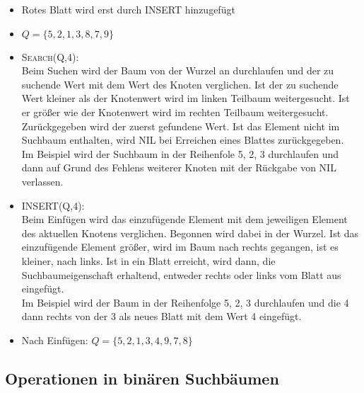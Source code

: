 \documentclass[ngerman,draft,parskip=half*,twoside]{scrreprt}
\theoremstyle{break}
\begin{document}
  \begin{itemize}
   \item Rotes Blatt wird erst durch INSERT hinzugefügt
   \item $Q = \{ 5, 2, 1, 3, 8, 7, 9 \}$
   \item \textsc{Search}(Q,4): \\
      Beim Suchen wird der Baum von der Wurzel an durchlaufen und der zu 
      suchende Wert mit dem Wert des Knoten verglichen. Ist der zu suchende 
      Wert kleiner als der Knotenwert wird im linken Teilbaum weitergesucht. 
      Ist er größer wie der Knotenwert wird im rechten Teilbaum 
      weitergesucht. Zurückgegeben wird der zuerst gefundene Wert. Ist das 
      Element nicht im Suchbaum enthalten, wird NIL bei Erreichen eines 
      Blattes zurückgegeben.\\
      Im Beispiel wird der Suchbaum in der Reihenfole 5, 2, 3 durchlaufen 
      und dann auf Grund des Fehlens weiterer Knoten mit der Rückgabe von 
      NIL verlassen.
   \item INSERT(Q,4): \\
      Beim Einfügen wird das einzufügende Element mit dem jeweiligen 
      Element des aktuellen Knotens verglichen. Begonnen wird dabei in der 
      Wurzel. Ist das einzufügende Element größer, wird im Baum nach 
      rechts gegangen, ist es kleiner, nach links. Ist in ein 
      Blatt erreicht, wird dann, die Suchbaumeigenschaft erhaltend, entweder rechts oder 
      links vom Blatt aus eingefügt.\\
      Im Beispiel wird der Baum in der Reihenfolge 5, 2, 3 
      durchlaufen und die 4 dann rechts von der 3 als neues Blatt mit dem Wert 4
      eingefügt.
   \item Nach Einfügen: $Q = \{ 5, 2, 1, 3, 4, 9, 7, 8 \}$
  \end{itemize}

  \subsection{Operationen in binären Suchbäumen}
\end{document}
